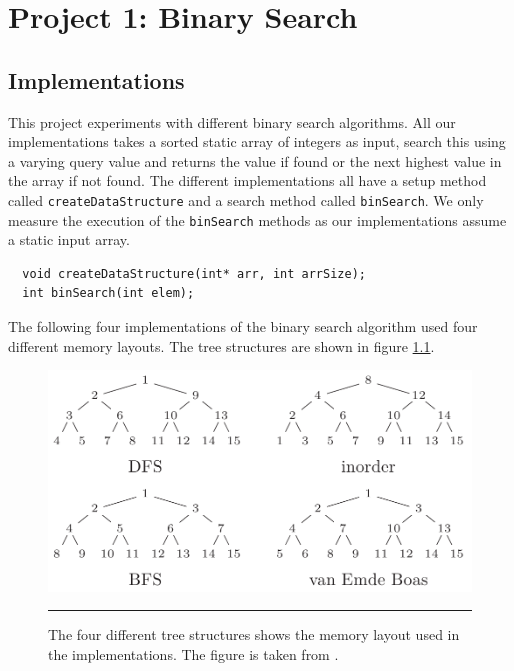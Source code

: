 
\chapter{Project 1: Binary Search} %

\label{Chapter1} %



\section{Implementations}
This project experiments with different binary search algorithms. All our implementations takes a sorted static array of integers as input, search
this using a varying query value and returns the value if found or the next highest value in the array if not found.
The different implementations all have a setup method called \verb!createDataStructure! and a search method called \verb!binSearch!.
We only measure the execution of the \verb!binSearch! methods as our implementations assume a static input array.
\begin{lstlisting}
  void createDataStructure(int* arr, int arrSize);
  int binSearch(int elem);
\end{lstlisting}

The following four implementations of the binary search algorithm used four different memory layouts. The tree structures are shown in figure \ref{fig:memory_layouts}.

\begin{figure}[htbp]
	\centering
		\includegraphics[width=\textwidth]{./Figures/Project1/MemoryLayouts.png}
		\rule{35em}{0.5pt}
	\caption[Memory layouts]{
	The four different tree structures shows the memory layout used in the implementations. The figure is taken from \citep{binAlg}.
	}
	\label{fig:memory_layouts}
\end{figure}



